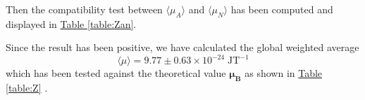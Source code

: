 \documentclass[a4paper,12pt,abstracton]{scrartcl}
\begin{document}
Then the compatibility test between $\langle \mu_A \rangle$ and $\langle \mu_N \rangle$ has been computed and displayed in \hyperref[table:Zan]{Table \ref*{table:Zan}}. 
\begin{table}[H]
\caption{}
\centering
{}
\label{table:Zan}
\end{table}

Since the result has been positive, we have calculated the global weighted average $$ \langle \mu\rangle=9.77 \pm  0.63\times 10^{-24}\;\text{JT}^{-1}$$ which has been tested against the theoretical value $\boldsymbol{\mu_B}$ as shown in \hyperref[table:Z]{Table \ref*{table:Z}} .

\begin{table}[H]
\caption{}
\centering
{}
\label{table:Z}
\end{table}

\clearpage
\end{document}
